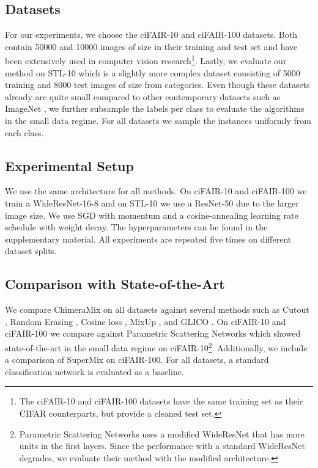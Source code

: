 \documentclass{article}
\newcommand{\methodname}{ChimeraMix\xspace}
\newcommand{\cifairX}{ciFAIR-10\xspace}
\newcommand{\cifairC}{ciFAIR-100\xspace}
\newcommand{\stl}{STL-10\xspace}
\begin{document}
\subsection{Datasets}

For our experiments, we choose the \cifairX and \cifairC \cite{barzWeTrainTest2020a} datasets.
Both contain \num{50000} and \num{10000} images of size  in their training and test set and have been extensively used in computer vision research\footnote{The \cifairX and \cifairC datasets have the same training set as their CIFAR \cite{krizhevskyLearningMultipleLayers2009} counterparts, but provide a cleaned test set.}.
Lastly, we evaluate our method on \stl \cite{coatesAnalysisSingleLayerNetworks2011} which is a slightly more complex dataset consisting of \num{5000} training and \num{8000} test images of size  from  categories.
Even though these datasets already are quite small compared to other contemporary datasets such as ImageNet \cite{russakovskyImageNetLargeScale2015}, we further subsample the labels per class to evaluate the algorithms in the small data regime.
For all datasets we sample the instances uniformly from each class.

\subsection{Experimental Setup}

We use the same architecture for all methods.
On \cifairX and \cifairC we train a WideResNet-16-8 and on \stl we use a ResNet-50 due to the larger image size.
We use SGD with momentum and a cosine-annealing learning rate schedule with weight decay.
The hyperparameters can be found in the supplementary material. All experiments are repeated five times on different dataset splits.

\subsection{Comparison with State-of-the-Art}
\label{subsec:comparison_to_sota}

We compare \methodname on all datasets against several methods such as Cutout \cite{devriesImprovedRegularizationConvolutional2017}, Random Erasing \cite{zhongRandomErasingData2020}, Cosine loss \cite{barzDeepLearningSmall2020},  MixUp \cite{zhangMixupEmpiricalRisk2018}, and \ac{GLICO} \cite{azuriGenerativeLatentImplicit2021}.
On \cifairX and \cifairC we compare against Parametric Scattering Networks \cite{gauthierParametricScatteringNetworks2021} which showed state-of-the-art in the small data regime on \cifairX \footnote{Parametric Scattering Networks uses a modified WideResNet that has more units in the first layers. Since the performance with a standard WideResNet degrades, we evaluate their method with the modified architecture.}.
Additionally, we include a comparison of SuperMix \cite{daboueiSuperMixSupervisingMixing2021} on \cifairC. 
For all datasets, a standard classification network is evaluated as a baseline.
\end{document}
